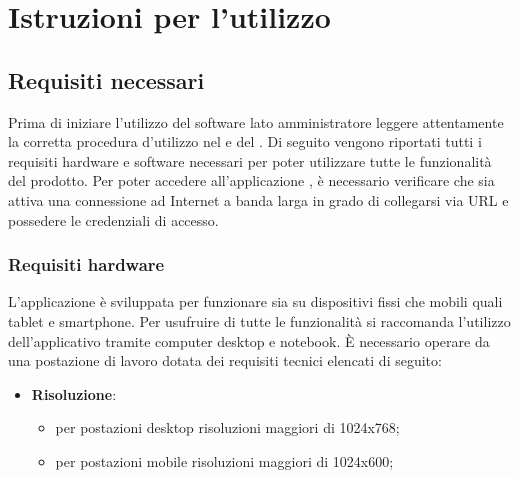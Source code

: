 %

\section{Istruzioni per l'utilizzo} %
\label{sec:istruzioni_per_l_utilizzo}


	\subsection{Requisiti necessari} %
	\label{sec:requisiti_necessari}
		Prima di iniziare l'utilizzo del software \projectName{} lato amministratore leggere attentamente la corretta procedura d'utilizzo nel \docNameVersionMU e del \docNameVersionMA.\newline
		Di seguito vengono riportati tutti i requisiti hardware\gloss{} e software\gloss{} necessari per poter utilizzare tutte le funzionalità del prodotto.\newline
		Per poter accedere all'applicazione \projectName, è necessario verificare che sia attiva una connessione ad Internet a banda larga\gloss{} in grado di collegarsi via URL\gloss{} e possedere le credenziali\gloss{} di accesso.


		\subsubsection{Requisiti hardware} %
		\label{sec:requisiti_hardware}
			L'applicazione è sviluppata per funzionare sia su dispositivi fissi che mobili quali tablet e smartphone.\newline
			Per usufruire di tutte le funzionalità si raccomanda l'utilizzo dell'applicativo tramite computer desktop e notebook.\newline
			È necessario operare da una postazione di lavoro dotata dei requisiti tecnici elencati di seguito:
			\begin{itemize}
				\item \textbf{Risoluzione}:
				\begin{itemize}
					\item per postazioni desktop risoluzioni maggiori di 1024x768;
					\item per postazioni mobile risoluzioni maggiori di 1024x600;
				\end{itemize}
			\end{itemize}


